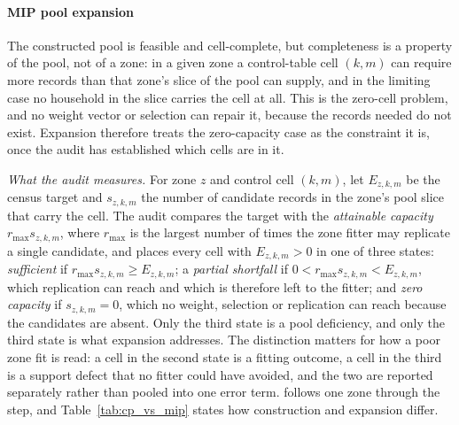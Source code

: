 \paragraph{MIP pool expansion}
\label{sec:mip_pool_expansion}
The constructed pool is feasible and cell-complete, but completeness is a
property of the pool, not of a zone: in a given zone a control-table cell
$(k,m)$ can require more records than that zone's slice of the pool can supply,
and in the limiting case no household in the slice carries the cell at all.
This is the zero-cell problem, and no weight vector or selection can repair it,
because the records needed do not exist. Expansion therefore treats the
zero-capacity case as the constraint it is, once the audit has established which
cells are in it.

\emph{What the audit measures.} For zone $z$ and control cell $(k,m)$, let
$E_{z,k,m}$ be the census target and $s_{z,k,m}$ the number of candidate records
in the zone's pool slice that carry the cell. The audit compares the target with
the \emph{attainable capacity} $r_{\max}s_{z,k,m}$, where $r_{\max}$ is the
largest number of times the zone fitter may replicate a single candidate, and
places every cell with $E_{z,k,m}>0$ in one of three states: \emph{sufficient}
if $r_{\max}s_{z,k,m}\ge E_{z,k,m}$; a \emph{partial shortfall} if
$0<r_{\max}s_{z,k,m}<E_{z,k,m}$, which replication can reach and which is
therefore left to the fitter; and \emph{zero capacity} if $s_{z,k,m}=0$, which
no weight, selection or replication can reach because the candidates are absent.
Only the third state is a pool deficiency, and only the third state is what
expansion addresses. The distinction matters for how a poor zone fit is read: a
cell in the second state is a fitting outcome, a cell in the third is a support
defect that no fitter could have avoided, and the two are reported separately
rather than pooled into one error term.  follows one
zone through the step, and Table~\ref{tab:cp_vs_mip} states how construction and
expansion differ.





